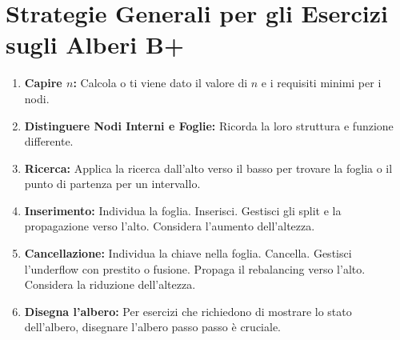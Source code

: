 \section{Strategie Generali per gli Esercizi sugli Alberi B+}
\begin{enumerate}
    \item \textbf{Capire $n$:} Calcola o ti viene dato il valore di $n$ e i requisiti minimi per i nodi.
    \item \textbf{Distinguere Nodi Interni e Foglie:} Ricorda la loro struttura e funzione differente.
    \item \textbf{Ricerca:} Applica la ricerca dall'alto verso il basso per trovare la foglia o il punto di partenza per un intervallo.
    \item \textbf{Inserimento:} Individua la foglia. Inserisci. Gestisci gli split e la propagazione verso l'alto. Considera l'aumento dell'altezza.
    \item \textbf{Cancellazione:} Individua la chiave nella foglia. Cancella. Gestisci l'underflow con prestito o fusione. Propaga il rebalancing verso l'alto. Considera la riduzione dell'altezza.
    \item \textbf{Disegna l'albero:} Per esercizi che richiedono di mostrare lo stato dell'albero, disegnare l'albero passo passo è cruciale.
\end{enumerate}

